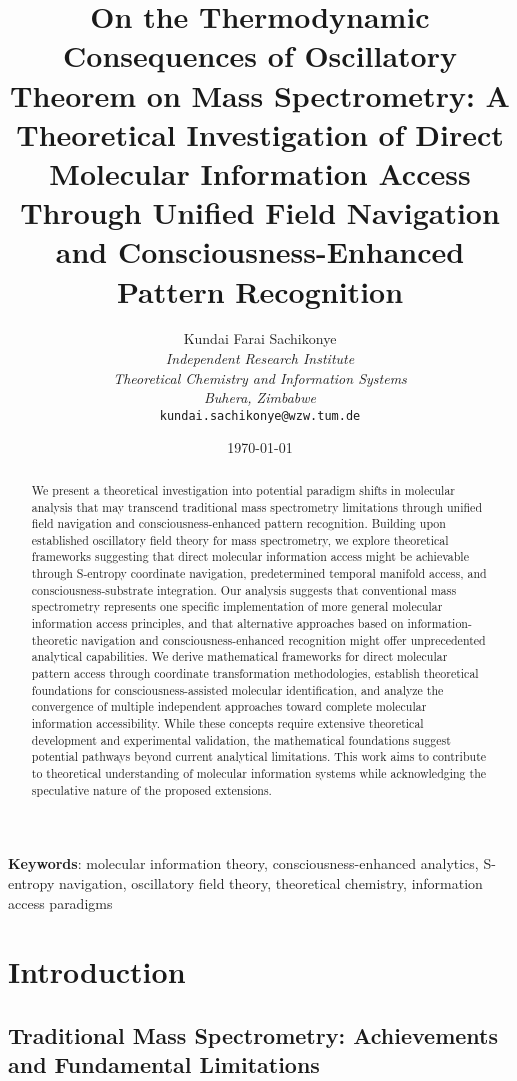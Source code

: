 \documentclass[11pt,a4paper]{article}
\title{On the Thermodynamic Consequences of Oscillatory Theorem on  Mass Spectrometry: A Theoretical Investigation of Direct Molecular Information Access Through Unified Field Navigation and Consciousness-Enhanced Pattern Recognition}
\author{
Kundai Farai Sachikonye\\
\textit{Independent Research Institute}\\
\textit{Theoretical Chemistry and Information Systems}\\
\textit{Buhera, Zimbabwe}\\
\texttt{kundai.sachikonye@wzw.tum.de}
}
\date{\today}
\theoremstyle{remark}
\begin{document}
\maketitle

\begin{abstract}
We present a theoretical investigation into potential paradigm shifts in molecular analysis that may transcend traditional mass spectrometry limitations through unified field navigation and consciousness-enhanced pattern recognition. Building upon established oscillatory field theory for mass spectrometry, we explore theoretical frameworks suggesting that direct molecular information access might be achievable through S-entropy coordinate navigation, predetermined temporal manifold access, and consciousness-substrate integration. Our analysis suggests that conventional mass spectrometry represents one specific implementation of more general molecular information access principles, and that alternative approaches based on information-theoretic navigation and consciousness-enhanced recognition might offer unprecedented analytical capabilities. We derive mathematical frameworks for direct molecular pattern access through coordinate transformation methodologies, establish theoretical foundations for consciousness-assisted molecular identification, and analyze the convergence of multiple independent approaches toward complete molecular information accessibility. While these concepts require extensive theoretical development and experimental validation, the mathematical foundations suggest potential pathways beyond current analytical limitations. This work aims to contribute to theoretical understanding of molecular information systems while acknowledging the speculative nature of the proposed extensions.
\end{abstract}

\textbf{Keywords}: molecular information theory, consciousness-enhanced analytics, S-entropy navigation, oscillatory field theory, theoretical chemistry, information access paradigms

\section{Introduction}

\subsection{Traditional Mass Spectrometry: Achievements and Fundamental Limitations}
\end{document}
